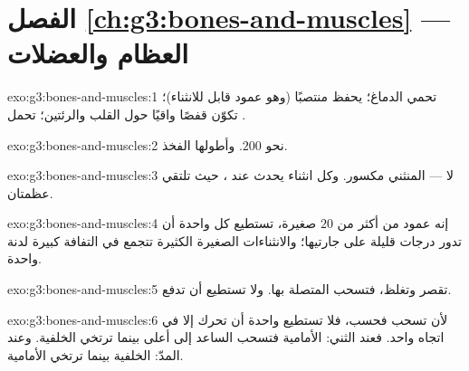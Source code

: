 \section*{الفصل \ref{ch:g3:bones-and-muscles} --- العظام والعضلات}

\begin{solution}{exo:g3:bones-and-muscles:1}
 تحمي الدماغ؛  يحفظ  منتصبًا (وهو عمود
قابل للانثناء)؛  تكوّن قفصًا واقيًا حول القلب والرئتين؛
  تحمل  .
\end{solution}

\begin{solution}{exo:g3:bones-and-muscles:2}
نحو $200$. وأطولها  الفخذ.
\end{solution}

\begin{solution}{exo:g3:bones-and-muscles:3}
لا ---  المنثني  مكسور. وكل انثناء يحدث عند ، حيث
تلتقي عظمتان.
\end{solution}

\begin{solution}{exo:g3:bones-and-muscles:4}
إنه عمود من أكثر من $20$  صغيرة، تستطيع كل واحدة أن تدور
درجات قليلة على جارتيها؛ والانثناءات الصغيرة الكثيرة تتجمع في
التفافة كبيرة لدنة واحدة.
\end{solution}

\begin{solution}{exo:g3:bones-and-muscles:5}
تقصر وتغلظ، فتسحب  المتصلة بها. ولا  تستطيع أن تدفع.
\end{solution}

\begin{solution}{exo:g3:bones-and-muscles:6}
لأن  تسحب فحسب، فلا تستطيع  واحدة أن تحرك  إلا
في اتجاه واحد. فعند الثني:   الأمامية فتسحب الساعد إلى
أعلى بينما ترتخي الخلفية. وعند المدّ:  الخلفية بينما ترتخي
الأمامية.
\end{solution}

